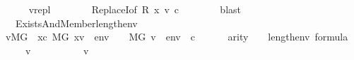 \begin{isabellebody}
\isanewline
\ \ \ \ \isamarkupfalse%
\ {\isachardoublequoteopen}v{\isasymin}{\isacharquery}{\kern0pt}repl{\isachardoublequoteclose}\isanewline
\ \ \ \ \ \ \isamarkupfalse%
\ ReplaceI{\isacharbrackleft}{\kern0pt}of\ {\isacharquery}{\kern0pt}R\ x\ v\ c{\isacharbrackright}{\kern0pt}\isanewline
\ \ \ \ \ \ \isamarkupfalse%
\ blast\isanewline
\ \ \isamarkupfalse%
\isanewline
\ \ \isamarkupfalse%
\isanewline
\ \ \isamarkupfalse%
\ {\isacharquery}{\kern0pt}{\isasympsi}\ {\isacharequal}{\kern0pt}\ {\isachardoublequoteopen}Exists{\isacharparenleft}{\kern0pt}And{\isacharparenleft}{\kern0pt}Member{\isacharparenleft}{\kern0pt}{}{\isacharcomma}{\kern0pt}{}{\isacharhash}{\kern0pt}{\isacharplus}{\kern0pt}length{\isacharparenleft}{\kern0pt}env{\isacharparenright}{\kern0pt}{\isacharparenright}{\kern0pt}{\isacharcomma}{\kern0pt}{\isasymphi}{\isacharparenright}{\kern0pt}{\isacharparenright}{\kern0pt}{\isachardoublequoteclose}\isanewline
\ \ \isamarkupfalse%
\ {\isachardoublequoteopen}v{\isasymin}M{\isacharbrackleft}{\kern0pt}G{\isacharbrackright}{\kern0pt}\ {\isasymLongrightarrow}\ {\isacharparenleft}{\kern0pt}{\isasymexists}x{\isasymin}c{\isachardot}{\kern0pt}\ M{\isacharbrackleft}{\kern0pt}G{\isacharbrackright}{\kern0pt}{\isacharcomma}{\kern0pt}\ {\isacharbrackleft}{\kern0pt}x{\isacharcomma}{\kern0pt}v{\isacharbrackright}{\kern0pt}\ {\isacharat}{\kern0pt}\ env\ {\isasymTurnstile}\ {\isasymphi}{\isacharparenright}{\kern0pt}\ {\isasymlongleftrightarrow}\ M{\isacharbrackleft}{\kern0pt}G{\isacharbrackright}{\kern0pt}{\isacharcomma}{\kern0pt}\ {\isacharbrackleft}{\kern0pt}v{\isacharbrackright}{\kern0pt}\ {\isacharat}{\kern0pt}\ env\ {\isacharat}{\kern0pt}\ {\isacharbrackleft}{\kern0pt}c{\isacharbrackright}{\kern0pt}\ {\isasymTurnstile}\ {\isacharquery}{\kern0pt}{\isasympsi}{\isachardoublequoteclose}\isanewline
\ \ \ \ {\isachardoublequoteopen}arity{\isacharparenleft}{\kern0pt}{\isacharquery}{\kern0pt}{\isasympsi}{\isacharparenright}{\kern0pt}\ {\isasymle}\ {}\ {\isacharhash}{\kern0pt}{\isacharplus}{\kern0pt}\ length{\isacharparenleft}{\kern0pt}env{\isacharparenright}{\kern0pt}{\isachardoublequoteclose}\ {\isachardoublequoteopen}{\isacharquery}{\kern0pt}{\isasympsi}{\isasymin}formula{\isachardoublequoteclose}\isanewline
\ \ \ \ \ v\isanewline
\ \ \isamarkupfalse%
\ {\isacharminus}{\kern0pt}\isanewline
\ \ \ \ \isamarkupfalse%
\ v\isanewline
\ \ \ \ \isamarkupfalse%

\end{isabellebody}

